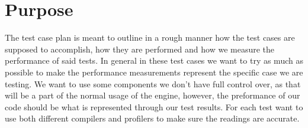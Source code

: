 \section{Purpose}

\noindent The test case plan is meant to outline in a rough manner how the test cases are supposed to accomplish, how they are performed and how we measure the performance of said tests.
In general in these test cases we want to try as much as possible to make the performance measurements represent the specific case we are testing.
We want to use some components we don't have full control over, as that will be a part of the normal usage of the engine, however, the preformance of our code should be what is represented through our test results. 
For each test want to use both different compilers and profilers to make sure the readings are accurate. 
